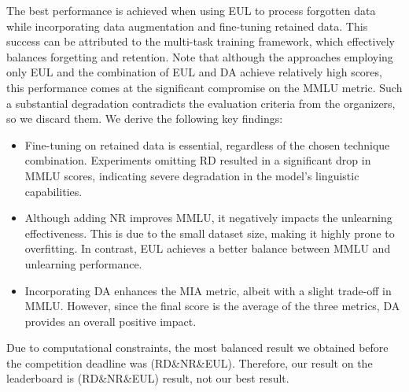 \documentclass[11pt]{article}
\begin{document}
The best performance is achieved when using EUL to process forgotten data while incorporating data augmentation and fine-tuning retained data. This success can be attributed to the multi-task training framework, which effectively balances forgetting and retention.
Note that although the approaches employing only EUL and the combination of EUL and DA achieve relatively high scores, this performance comes at the significant compromise on the MMLU metric. 
Such a substantial degradation contradicts the evaluation criteria from the organizers, so we discard them.
We derive the following key findings:
\begin{itemize}
	\item Fine-tuning on retained data is essential, regardless of the chosen technique combination. Experiments omitting RD resulted in a significant drop in MMLU scores, indicating severe degradation in the model’s linguistic capabilities.
	\item Although adding NR improves MMLU, it negatively impacts the unlearning effectiveness. This is due to the small dataset size, making it highly prone to overfitting. In contrast, EUL achieves a better balance between MMLU and unlearning performance.
	\item Incorporating DA enhances the MIA metric, albeit with a slight trade-off in MMLU. However, since the final score is the average of the three metrics, DA provides an overall positive impact.
\end{itemize}


Due to computational constraints, the most balanced result we obtained before the competition deadline was (RD\&NR\&EUL). Therefore, our result on the leaderboard is (RD\&NR\&EUL) result, not our best result.
\end{document}
